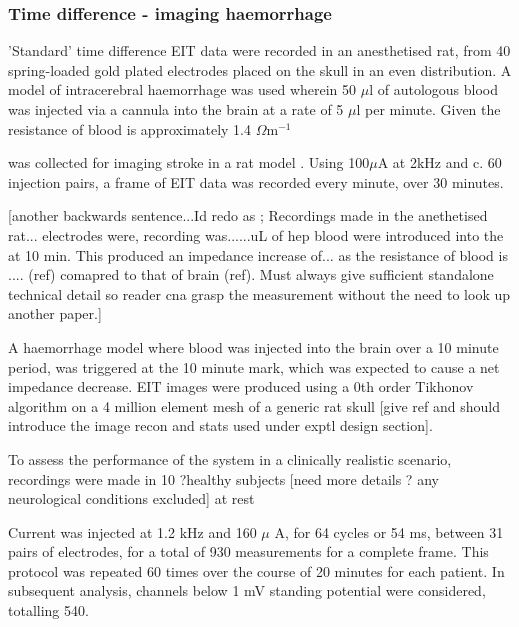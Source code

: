 \subsubsection{Time difference - imaging haemorrhage}
\label{methodsTD}
'Standard' time difference EIT data were recorded in an anesthetised rat, from 40 spring-loaded gold plated electrodes placed on the skull in an even distribution. A model of intracerebral haemorrhage was used wherein 50 $\mu$l of autologous blood was injected via a cannula into the brain at a rate of 5 $\mu$l per minute. Given the resistance of blood is approximately 1.4 $\Omega {\text{m}}^{-1}$




was collected for imaging stroke in a rat model \cite{Dowrick_2016}. Using 100\( \mu \)A at 2kHz and c. 60 injection pairs, a frame of EIT data was recorded every minute, over 30 minutes. 

[another backwards sentence...Id redo as ; Recordings made in the anethetised rat... electrodes were, recording was......uL of hep blood were introduced into the at 10 min. This produced an impedance increase of... as the resistance of blood is .... (ref) comapred to that of brain (ref). Must always give sufficient standalone technical detail so reader cna grasp the measurement without the need to look up another paper.]



A haemorrhage model where blood was injected into the brain over a 10 minute period, was triggered at the 10 minute mark, which was expected to cause a net impedance decrease. EIT images were produced using a 0th order Tikhonov algorithm on a 4 million element mesh of a generic rat skull [give ref and should introduce the image recon and stats used under exptl design section].

To assess the performance of the system in a clinically realistic scenario, recordings were made in 10 ?healthy subjects [need more details ? any neurological conditions excluded] at rest 



Current was injected at 1.2 kHz and 160 $\mu$ A, for 64 cycles or 54 ms, between 31 pairs of electrodes, for a total of 930 measurements for a complete frame. This protocol was repeated 60 times over the course of 20 minutes for each patient. In subsequent analysis, channels below 1 mV standing potential were considered, totalling 540. 